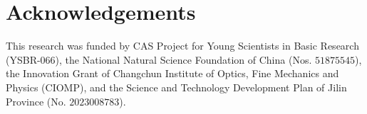 \documentclass{article}
\begin{document}
\section*{Acknowledgements}
This research was funded by CAS Project for Young Scientists in Basic Research (YSBR-$066$), the National Natural Science Foundation of China (Nos. $51875545$), the Innovation Grant of Changchun Institute of Optics, Fine Mechanics and Physics (CIOMP), and the Science and Technology Development Plan of Jilin Province (No. $2023008783$).


  
 



 






\end{document}
